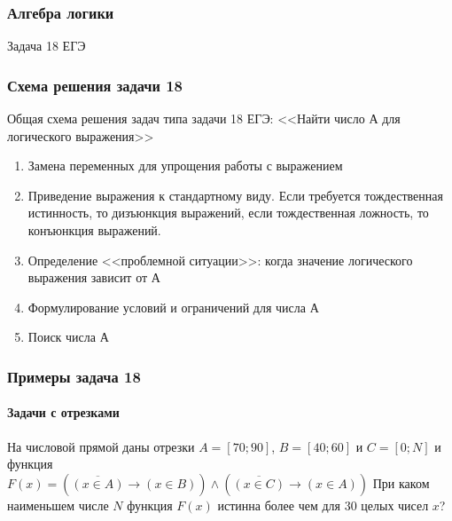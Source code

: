 \subtitle{Лекция 6 --- Алгебра логики. Часть 3 --- Примеры решения задач}

\frame[plain]
{\titlepage}	%


\begin{frame}
\frametitle{Алгебра логики}

\begin{center}

\Huge
Задача 18 ЕГЭ
	
\end{center}


\end{frame}

\begin{frame}
\frametitle{Схема решения задачи 18}

Общая схема решения задач типа задачи 18 ЕГЭ: <<Найти число А для логического выражения>>
\begin{enumerate}
	\item Замена переменных для упрощения работы с выражением
	\item Приведение выражения к стандартному виду. Если требуется тождественная истинность, то дизъюнкция выражений, если тождественная ложность, то конъюнкция выражений.
	\item Определение <<проблемной ситуации>>: когда значение логического выражения зависит от А
	\item Формулирование условий и ограничений для числа А
	\item Поиск числа А
\end{enumerate}


\end{frame}

\begin{frame}[t]
\frametitle{Примеры задача 18}
\framesubtitle{Задачи с отрезками}

На числовой прямой даны отрезки $A = [70; 90]$, $B = [40; 60]$ и $C = [0; N]$ и функция \\
$F(x) = (\overline{(x \in A)} \rightarrow (x \in B) ) \wedge (\overline{(x \in C)} \rightarrow (x \in A) )$
При каком наименьшем числе $N$ функция $F(x)$ истинна более чем для $30$ целых чисел $x$?


	
\end{frame}

